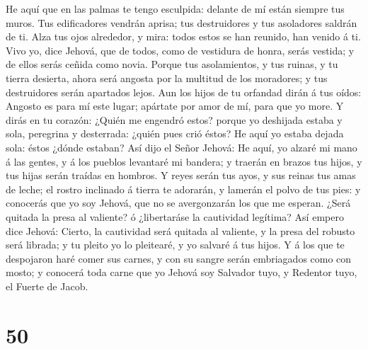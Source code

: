  He aquí que en las palmas te tengo esculpida: delante de
mí están siempre tus muros.  Tus edificadores vendrán
aprisa; tus destruidores y tus asoladores saldrán de ti. 
Alza tus ojos alrededor, y mira: todos estos se han reunido, han venido
á ti. Vivo yo, dice Jehová, que de todos, como de vestidura de honra,
serás vestida; y de ellos serás ceñida como novia.  Porque
tus asolamientos, y tus ruinas, y tu tierra desierta, ahora será angosta
por la multitud de los moradores; y tus destruidores serán apartados
lejos.  Aun los hijos de tu orfandad dirán á tus oídos:
Angosto es para mí este lugar; apártate por amor de mí, para que yo
more.  Y dirás en tu corazón: ¿Quién me engendró estos?
porque yo deshijada estaba y sola, peregrina y desterrada: ¿quién pues
crió éstos? He aquí yo estaba dejada sola: éstos ¿dónde estaban?
 Así dijo el Señor Jehová: He aquí, yo alzaré mi mano á las
gentes, y á los pueblos levantaré mi bandera; y traerán en brazos tus
hijos, y tus hijas serán traídas en hombros.  Y reyes serán
tus ayos, y sus reinas tus amas de leche; el rostro inclinado á tierra
te adorarán, y lamerán el polvo de tus pies: y conocerás que yo soy
Jehová, que no se avergonzarán los que me esperan.  ¿Será
quitada la presa al valiente? ó ¿libertaráse la cautividad legítima?
 Así empero dice Jehová: Cierto, la cautividad será quitada
al valiente, y la presa del robusto será librada; y tu pleito yo lo
pleitearé, y yo salvaré á tus hijos.  Y á los que te
despojaron haré comer sus carnes, y con su sangre serán embriagados como
con mosto; y conocerá toda carne que yo Jehová soy Salvador tuyo, y
Redentor tuyo, el Fuerte de Jacob.

\hypertarget{section-49}{%
\section{50}\label{section-49}}

